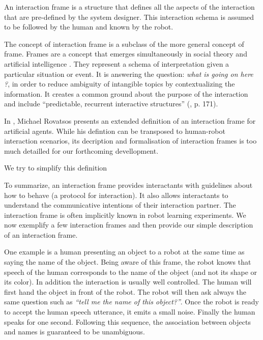An interaction frame \cite{rovatsos2001interaction} is a structure that defines all the aspects of the interaction that are pre-defined by the system designer. This interaction schema is assumed to be followed by the human and known by the robot.

The concept of interaction frame is a subclass of the more general concept of frame. Frames are a concept that emerges simultaneously in social theory \cite{goffman1974frame} and artificial intelligence \cite{minsky1974framework}. They represent a schema of interpretation given a particular situation or event. It is answering the question: \emph{what is going on here ?}, in order to reduce ambiguity of intangible topics by contextualizing the information. It creates a common ground about the purpose of the interaction \cite{tomasello2009cultural,rohlfing2013learning} and include ``predictable, recurrent interactive structures'' (\cite{ninio1996pragmatic}, p. 171). 

In \cite{rovatsos2001interaction}, Michael Rovatsos presents an extended definition of an interaction frame for artificial agents. While his defintion can be transposed to human-robot interaction scenarios, its decription and formalisation of interaction frames is too much detailled for our forthcoming devellopment. 


We try to simplify this definition 

To summarize, an interaction frame provides interactants with guidelines about how to behave (a protocol for interaction). It also allows interactants to understand the communicative intentions of their interaction partner. The interaction frame is often implicitly known in robot learning experiments. We now exemplify a few interaction frames and then provide our simple description of an interaction frame.

One example is a human presenting an object to a robot at the same time as saying the name of the object. Being aware of this frame, the robot knows that speech of the human corresponds to the name of the object (and not its shape or its color). In addition the interaction is usually well controlled. The human will first hand the object in front of the robot. The robot will then ask always the same question such as \emph{``tell me the name of this object?''}. Once the robot is ready to accept the human speech utterance, it emits a small noise.  Finally the human speaks for one second. Following this sequence, the association between objects and names is guaranteed to be unambiguous.

